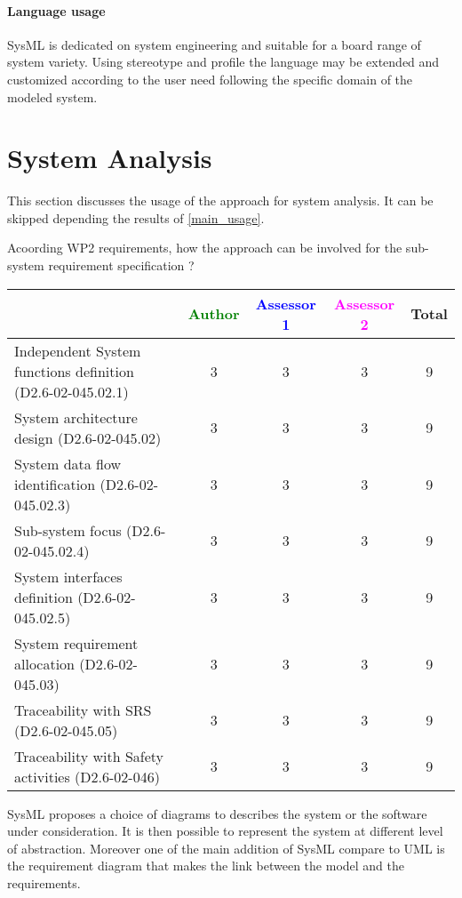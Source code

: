 \paragraph{Language usage} 
SysML is dedicated on system engineering and suitable for a board range of
system variety. Using stereotype and profile the language may be
extended and customized according to the user need following the
specific domain of the modeled system.


\section{System Analysis}
This section discusses the usage of the approach for system analysis.
It can be skipped depending the results of \ref{main_usage}.

Acoording WP2 requirements, how the approach can be involved for the sub-system requirement specification ?

\begin{tabular}{|l | c | c | c | c|}
\hline
& \textcolor{green}{Author} & \textcolor{blue}{Assessor 1} & \textcolor{magenta}{Assessor 2} & Total \\
\hline
Independent System functions definition (D2.6-02-045.02.1)  &3 & 3& 3 & 9 \\
\hline 
System architecture design (D2.6-02-045.02) &3 & 3& 3& 9 \\
\hline
System data flow identification (D2.6-02-045.02.3)  &3 & 3& 3& 9 \\
\hline
Sub-system focus (D2.6-02-045.02.4)  &3 & 3& 3& 9 \\
\hline
System interfaces definition (D2.6-02-045.02.5)  &3 & 3& 3& 9 \\
\hline
System requirement allocation (D2.6-02-045.03)  &3 & 3& 3& 9  \\
\hline
Traceability with SRS (D2.6-02-045.05)  &3 & 3& 3& 9  \\
\hline
Traceability with Safety activities (D2.6-02-046)  &3 & 3& 3& 9 \\
\hline
\end{tabular}
\begin{author_comment}
  SysML proposes a choice of diagrams to describes the system or the
  software under consideration. It is then possible to represent the
  system at different level of abstraction. Moreover one of the main
  addition of SysML compare to UML is the requirement diagram that
  makes the link between the model and the requirements.
\end{author_comment}


